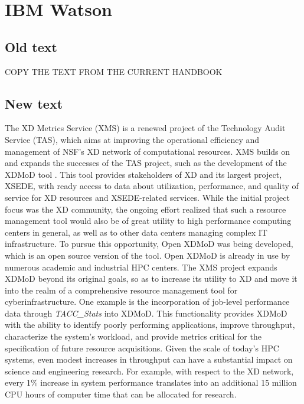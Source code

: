 \section{IBM Watson}

\subsection{Old text}

COPY THE TEXT FROM THE CURRENT HANDBOOK

\subsection{New text}

The XD Metrics Service (XMS) \cite{hid-sample-vonLaszewski15tas} is a
renewed project of the Technology Audit Service (TAS), which aims at
improving the operational efficiency and management of NSF's XD
network of computational resources. XMS builds on and expands the
successes of the TAS project, such as the development of the XDMoD
tool . This tool provides stakeholders of XD and its
largest project, XSEDE, with ready access to data about utilization,
performance, and quality of service for XD resources and XSEDE-related
services. While the initial project focus was the XD community, the
ongoing effort realized that such a resource management tool would
also be of great utility to high performance computing centers in
general, as well as to other data centers managing complex IT
infrastructure. To pursue this opportunity, Open XDMoD was being
developed, which is an open source version of the tool. Open XDMoD is
already in use by numerous academic and industrial HPC centers. The
XMS project expands XDMoD beyond its original goals, so as to increase
its utility to XD and move it into the realm of a comprehensive
resource management tool for cyberinfrastructure. One example is the
incorporation of job-level performance data through
\textit{TACC\_Stats} into XDMoD. This functionality
provides XDMoD with the ability to identify poorly performing
applications, improve throughput, characterize the system's workload,
and provide metrics critical for the specification of future resource
acquisitions. Given the scale of today's HPC systems, even modest
increases in throughput can have a substantial impact on science and
engineering research. For example, with respect to the XD network,
every 1\% increase in system performance translates into an additional
15 million CPU hours of computer time that can be allocated for
research.


